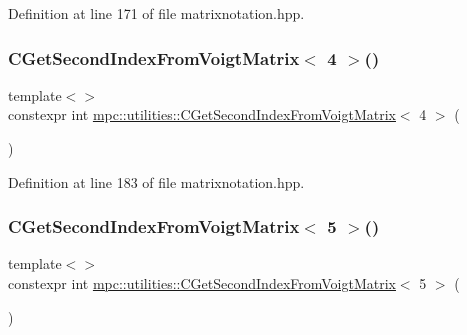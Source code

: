 Definition at line 171 of file matrixnotation.\+hpp.

\mbox{\label{namespacempc_1_1utilities_a2e002bb3ea9c528659336d38b86cbaf8}} 
\subsubsection{\texorpdfstring{C\+Get\+Second\+Index\+From\+Voigt\+Matrix$<$ 4 $>$()}{CGetSecondIndexFromVoigtMatrix< 4 >()}}
{\footnotesize\ttfamily template$<$$>$ \\
constexpr int \mbox{\hyperlink{namespacempc_1_1utilities_a094a324d81b996e8397336286264dfcd}{mpc\+::utilities\+::\+C\+Get\+Second\+Index\+From\+Voigt\+Matrix}}$<$ 4 $>$ (\begin{DoxyParamCaption}{ }\end{DoxyParamCaption})\hspace{0.3cm}{\ttfamily [inline]}}



Definition at line 183 of file matrixnotation.\+hpp.

\mbox{\label{namespacempc_1_1utilities_a070e4f2163645cfbe7e03651d594016e}} 
\subsubsection{\texorpdfstring{C\+Get\+Second\+Index\+From\+Voigt\+Matrix$<$ 5 $>$()}{CGetSecondIndexFromVoigtMatrix< 5 >()}}
{\footnotesize\ttfamily template$<$$>$ \\
constexpr int \mbox{\hyperlink{namespacempc_1_1utilities_a094a324d81b996e8397336286264dfcd}{mpc\+::utilities\+::\+C\+Get\+Second\+Index\+From\+Voigt\+Matrix}}$<$ 5 $>$ (\begin{DoxyParamCaption}{ }\end{DoxyParamCaption})\hspace{0.3cm}{\ttfamily [inline]}}



